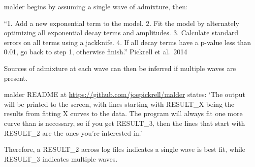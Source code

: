 \documentclass[
]{article}
\begin{document}
malder begins by assuming a single wave of admixture, then:

``1. Add a new exponential term to the model. 2. Fit the model by
alternately optimizing all exponential decay terms and amplitudes. 3.
Calculate standard errors on all terms using a jackknife. 4. If all
decay terms have a p-value less than 0.01, go back to step 1, otherwise
finish.'' Pickrell et al.~2014

Sources of admixture at each wave can then be inferred if multiple waves
are present.

malder README at \url{https://github.com/joepickrell/malder} states:
`The output will be printed to the screen, with lines starting with
RESULT\_X being the results from fitting X curves to the data. The
program will always fit one more curve than is necessary, so if you get
RESULT\_3, then the lines that start with RESULT\_2 are the ones you're
interested in.'

Therefore, a RESULT\_2 across log files indicates a single wave is best
fit, while RESULT\_3 indicates multiple waves.
\end{document}
